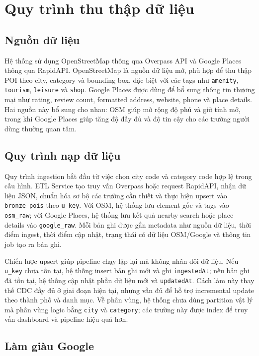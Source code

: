 \documentclass[12pt,a4paper]{article}
\begin{document}
\section{Quy trình thu thập dữ liệu}

\subsection{Nguồn dữ liệu}

Hệ thống sử dụng OpenStreetMap thông qua Overpass API và Google Places thông qua RapidAPI. OpenStreetMap là nguồn dữ liệu mở, phù hợp để thu thập POI theo city, category và bounding box, đặc biệt với các tags như \texttt{amenity}, \texttt{tourism}, \texttt{leisure} và \texttt{shop}. Google Places được dùng để bổ sung thông tin thương mại như rating, review count, formatted address, website, phone và place details. Hai nguồn này bổ sung cho nhau: OSM giúp mở rộng độ phủ và giữ tính mở, trong khi Google Places giúp tăng độ đầy đủ và độ tin cậy cho các trường người dùng thường quan tâm.

\subsection{Quy trình nạp dữ liệu}

Quy trình ingestion bắt đầu từ việc chọn city code và category code hợp lệ trong cấu hình. ETL Service tạo truy vấn Overpass hoặc request RapidAPI, nhận dữ liệu JSON, chuẩn hóa sơ bộ các trường cần thiết và thực hiện upsert vào \texttt{bronze\_pois} theo \texttt{u\_key}. Với OSM, hệ thống lưu element gốc và tags vào \texttt{osm\_raw}; với Google Places, hệ thống lưu kết quả nearby search hoặc place details vào \texttt{google\_raw}. Mỗi bản ghi được gắn metadata như nguồn dữ liệu, thời điểm ingest, thời điểm cập nhật, trạng thái có dữ liệu OSM/Google và thông tin job tạo ra bản ghi.

Chiến lược upsert giúp pipeline chạy lặp lại mà không nhân đôi dữ liệu. Nếu \texttt{u\_key} chưa tồn tại, hệ thống insert bản ghi mới và ghi \texttt{ingestedAt}; nếu bản ghi đã tồn tại, hệ thống cập nhật phần dữ liệu mới và \texttt{updatedAt}. Cách làm này thay thế CDC đầy đủ ở giai đoạn hiện tại, nhưng vẫn đủ để hỗ trợ incremental update theo thành phố và danh mục. Về phân vùng, hệ thống chưa dùng partition vật lý mà phân vùng logic bằng \texttt{city} và \texttt{category}; các trường này được index để truy vấn dashboard và pipeline hiệu quả hơn.

\subsection{Làm giàu Google}
\end{document}
